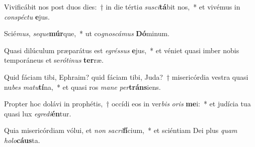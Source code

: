 \item Vivificábit nos post duos dies:~† in die térti\textit{a} \textit{su}\textit{sci}\textbf{tá}bit nos,~* et vivémus in \textit{con}\textit{spéc}\textit{tu} \textbf{e}jus.
\item Scié\textit{mus}, \textit{se}\textit{que}\textbf{múr}que,~* ut co\textit{gnos}\textit{cá}\textit{mus} \textbf{Dó}minum.
\item Quasi dilúculum præparátus est \textit{e}\textit{grés}\textit{sus} \textbf{e}jus,~* et véniet quasi imber nobis temporáneus et se\textit{ró}\textit{ti}\textit{nus} \textbf{ter}ræ.
\item Quid fáciam tibi, Ephraim? quid fáciam tibi, Juda?~† misericórdia vestra quasi nu\textit{bes} \textit{ma}\textit{tu}\textbf{tí}na,~* et quasi ros \textit{ma}\textit{ne} \textit{per}\textbf{tráns}iens.
\item Propter hoc dolávi in prophétis,~† occídi eos in ver\textit{bis} \textit{o}\textit{ris} \textbf{me}i:~* et judícia tua quasi lux \textit{e}\textit{gre}\textit{di}\textbf{én}tur.
\item Quia misericórdiam vólui, et \textit{non} \textit{sa}\textit{cri}\textbf{fí}cium,~* et sciéntiam Dei plus \textit{quam} \textit{ho}\textit{lo}\textbf{cáus}ta.
